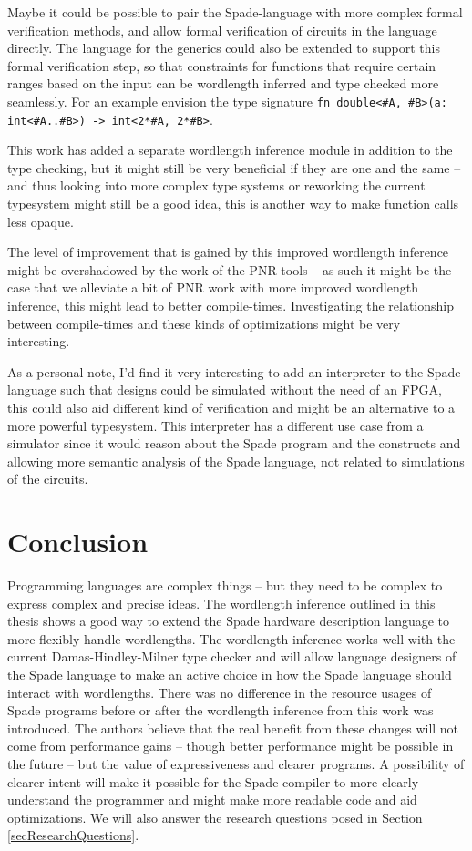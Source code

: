 Maybe it could be possible to pair the Spade-language with more complex formal verification methods, and allow formal verification of circuits in the language directly. The language for the generics could also be extended to support this formal verification step, so that constraints for functions that require certain ranges based on the input can be wordlength inferred and type checked more seamlessly. For an example envision the type signature \verb+fn double<#A, #B>(a: int<#A..#B>) -> int<2*#A, 2*#B>+.

This work has added a separate wordlength inference module in addition to the type checking, but it might still be very beneficial if they are one and the same -- and thus looking into more complex type systems or reworking the current typesystem might still be a good idea, this is another way to make function calls less opaque.

The level of improvement that is gained by this improved wordlength inference might be overshadowed by the work of the PNR tools -- as such it might be the case that we alleviate a bit of PNR work with more improved wordlength inference, this might lead to better compile-times. Investigating the relationship between compile-times and these kinds of optimizations might be very interesting.

As a personal note, I'd find it very interesting to add an interpreter to the Spade-language such that designs could be simulated without the need of an FPGA, this could also aid different kind of verification and might be an alternative to a more powerful typesystem. This interpreter has a different use case from a simulator since it would reason about the Spade program and the constructs and allowing more semantic analysis of the Spade language, not related to simulations of the circuits.

\chapter{Conclusion}
\label{cha:Conclusion}
Programming languages are complex things -- but they need to be complex to express complex and precise ideas. The wordlength inference outlined in this thesis shows a good way to extend the Spade hardware description language to more flexibly handle wordlengths. The wordlength inference works well with the current Damas-Hindley-Milner type checker and will allow language designers of the Spade language to make an active choice in how the Spade language should interact with wordlengths. There was no difference in the resource usages of Spade programs before or after the wordlength inference from this work was introduced. The authors believe that the real benefit from these changes will not come from performance gains -- though better performance might be possible in the future -- but the  value of expressiveness and clearer programs. A possibility of clearer intent will make it possible for the Spade compiler to more clearly understand the programmer and might make more readable code and aid optimizations. We will also answer the research questions posed in Section \ref{secResearchQuestions}.


